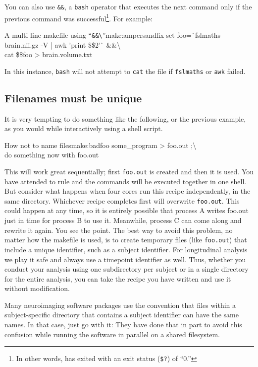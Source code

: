 You can also use \texttt{\&\&}, a \texttt{bash} operator that executes the next command only if the previous command was successful\footnote{In other words, has exited with an exit status (\texttt{\$?}) of ``0.''}. For example:
\begin{make}{A multi-line makefile using ``\texttt{\&\&\textbackslash}''}{make:ampersandfix}
	set foo=\`{}fslmaths brain.nii.gz -V | awk '{print \$\$2}'\`{} \&\&\textbackslash\\
	cat \$\$foo > brain.volume.txt
\end{make}

In this instance, \texttt{bash} will not attempt to \texttt{cat} the file if \texttt{fslmaths} or \texttt{awk} failed.

\subsection{Filenames must be unique}

It is very tempting to do something like the following, or the previous example, as  you would while interactively using a shell script.
\begin{make}{How not to name files}{make:badfoo}
	some_program > foo.out ;\textbackslash \\
	do something \dd now \dd with foo.out
\end{make}

This will work great sequentially; first \texttt{foo.out} is created and then it is used. You have attended to rule  and the commands will be executed together in one shell. But consider what happens when four cores run this recipe independently, in the same directory. Whichever recipe completes first will overwrite \texttt{foo.out}. This could happen at any time, so it is entirely possible that process A writes foo.out just in time for process B to use it. Meanwhile, process C can come along and rewrite it again. You see the point. The best way to avoid this problem, no matter how the makefile is used, is to create temporary files (like \texttt{foo.out}) that include a unique identifier, such as a subject identifier. For longitudinal analysis we play it safe and always use a timepoint identifier as well. Thus, whether you conduct your analysis using one subdirectory per subject or in a single directory for the entire analysis, you can take the recipe you have written and use it without modification.

Many neuroimaging software packages use the convention that files within a subject-specific directory that contains a subject identifier can have the same names. In that case, just go with it: They have done that in part to avoid this confusion while running the software in parallel on a shared filesystem.

